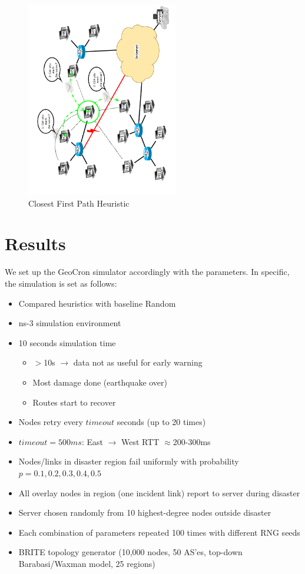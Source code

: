 \documentclass[conference]{IEEEtran}
\begin{document}
\begin{figure}
\centering
\includegraphics[width=2.6in,angle=-90]{../../images/diagrams/nearest_neighbor}
\caption{Closest First Path Heuristic}
\end{figure}

%
\newpage

\section{Results}
We set up the GeoCron simulator accordingly with the parameters.
In specific, the simulation is set as follows:

\begin{itemize}
	\item Compared heuristics with baseline Random
	\item ns-3 simulation environment
	\item 10 seconds simulation time
	\begin{itemize}
		\item $>$10s $\rightarrow$ data not as useful for early warning
		\item Most damage done (earthquake over)
		\item Routes start to recover
	\end{itemize}
	\item Nodes retry every $timeout$ seconds (up to 20 times)
	\item $timeout = 500ms$: East $\rightarrow$ West RTT $\approx$200-300ms
	\item Nodes/links in disaster region fail uniformly with probability $p = 0.1, 0.2, 0.3, 0.4, 0.5$
	\item All overlay nodes in region (one incident link) report to server during disaster
	\item Server chosen randomly from 10 highest-degree nodes outside disaster
	\item Each combination of parameters repeated 100 times with different RNG seeds
	\item BRITE topology generator (10,000 nodes, 50 AS'es, top-down Barabasi/Waxman model, 25 regions)
\end{itemize}
\end{document}
